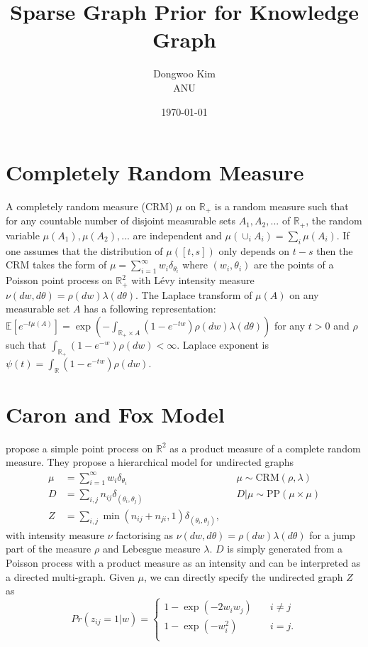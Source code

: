 \documentclass{article}
\title{Sparse Graph Prior for Knowledge Graph}
\date{\today}
\author{Dongwoo Kim\\ANU}
\begin{document}
\maketitle

\section{Completely Random Measure}
A completely random measure (CRM) $\mu$ on $\mathbb{R}_+$ is a random measure such that for any countable number of disjoint measurable sets $A_1, A_2, ...$ of $\mathbb{R}_+$, the random variable $\mu(A_1), \mu(A_2), ...$ are independent and $\mu(\cup_i A_i) = \sum_i \mu(A_i)$. If one assumes that the distribution of $\mu([t,s])$ only depends on $t-s$ then the CRM takes the form of $\mu = \sum_{i=1}^{\infty}w_i\delta_{\theta_i}$ where $(w_i, \theta_i)$ are the points of a Poisson point process on $\mathbb{R}_+^2$ with L\'{e}vy intensity measure $\nu(dw, d\theta) = \rho(dw)\lambda(d\theta)$. The Laplace transform of $\mu(A)$ on any measurable set $A$ has a following representation: $\mathbb{E}[e^{-t\mu(A)}] = \exp(-\int_{\mathbb{R}_+ \times A}(1-e^{-tw})\rho(dw)\lambda(d\theta))$ for any $t>0$ and $\rho$ such that $\int_{\mathbb{R}_+}(1-e^{-w})\rho(dw) < \infty$. Laplace exponent is $\psi(t) = \int_{\mathbb{R}} (1 - e^{-t w}) \rho(dw)$.

\section{Caron and Fox Model}

\cite{Caron2015} propose a simple point process on $\mathbb{R}^2$ as a product measure of a complete random measure. They propose a hierarchical model for undirected graphs
\begin{align}
\mu &= \sum_{i=1}^{\infty} w_i \delta_{\theta_i} & &\mu \sim \text{CRM}(\rho, \lambda)\\
D &= \sum_{i,j} n_{ij} \delta_{(\theta_i, \theta_j)} & &D|\mu \sim \text{PP}(\mu \times \mu)\\
Z &=\sum_{i,j} \min(n_{ij} + n_{ji}, 1)\delta_{(\theta_i, \theta_j)}, \label{eqn:cnf}&&
\end{align}
with intensity measure $\nu$ factorising as $\nu(dw, d\theta) = \rho(dw) \lambda(d\theta)$ for a jump part of the measure $\rho$ and Lebesgue measure $\lambda$. $D$ is simply generated from a Poisson process with a product measure as an intensity and can be interpreted as a directed multi-graph.
Given $\mu$, we can directly specify the undirected graph $Z$ as
\[ Pr(z_{ij}=1|w) = 
  \begin{cases}
    1 - \exp(-2w_iw_j)       & \quad i \neq j\\
    1 - \exp(-w_i^2) & \quad i = j.\\
  \end{cases}
\]
\end{document}
